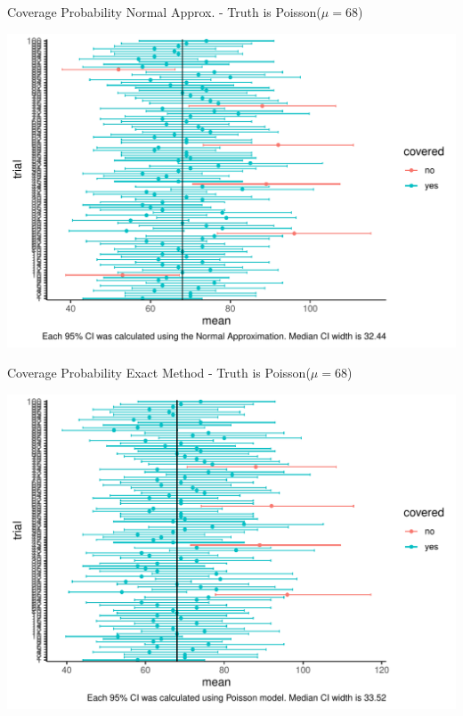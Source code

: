 \documentclass[10pt,handout]{beamer}\usepackage[]{graphicx}\usepackage[]{color}
\makeatletter
\def\maxwidth{ %
  \ifdim\Gin@nat@width>\linewidth
    \linewidth
  \else
    \Gin@nat@width
  \fi
}
\newenvironment{knitrout}{}{} %
\makeatother
\begin{document}
\begin{frame}[fragile]{Coverage Probability Normal Approx. - Truth is Poisson($\mu=68$)}
	
\begin{knitrout}\tiny
{}\color{fgcolor}

{\centering \includegraphics[width=\maxwidth]{figure/unnamed-chunk-7-1} 

}


\end{knitrout}
	
\end{frame}



\begin{frame}[fragile]{Coverage Probability Exact Method - Truth is Poisson($\mu=68$)}
	
\begin{knitrout}\tiny
{}\color{fgcolor}

{\centering \includegraphics[width=\maxwidth]{figure/unnamed-chunk-8-1} 

}


\end{knitrout}
	
\end{frame}
\end{document}
